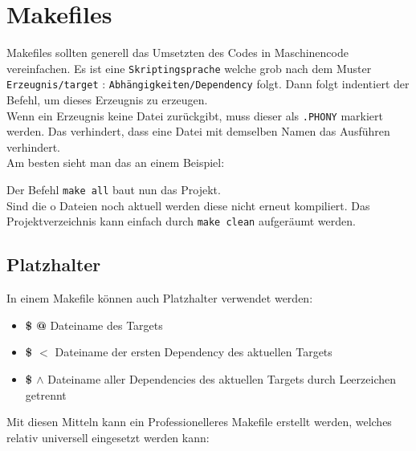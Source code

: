 \section{Makefiles}

Makefiles sollten generell das Umsetzten des Codes in Maschinencode vereinfachen.
Es ist eine \texttt{Skriptingsprache} welche grob nach dem Muster \texttt{Erzeugnis/target} : \texttt{Abhängigkeiten/Dependency} folgt. 
Dann folgt indentiert der Befehl, um dieses Erzeugnis zu erzeugen.\\
Wenn ein Erzeugnis keine Datei zurückgibt, muss dieser als \texttt{.PHONY} markiert werden. 
Das verhindert, dass eine Datei mit demselben Namen das Ausführen verhindert.\\
Am besten sieht man das an einem Beispiel:


Der Befehl \texttt{make all} baut nun das Projekt.\\
Sind die o Dateien noch aktuell werden diese nicht erneut kompiliert. 
Das Projektverzeichnis kann einfach durch \texttt{make clean} aufgeräumt werden.

\subsection{Platzhalter}

In einem Makefile können auch Platzhalter verwendet werden:

\begin{itemize}[itemsep=1pt, parsep=0pt]
    \item \textbf{\$ @} Dateiname des Targets
    \item \textbf{\$ $<$} Dateiname der ersten Dependency des aktuellen Targets
    \item \textbf{\$ $\wedge$} Dateiname aller Dependencies des aktuellen Targets durch Leerzeichen getrennt
\end{itemize}

Mit diesen Mitteln kann ein Professionelleres Makefile erstellt werden, welches relativ universell eingesetzt werden kann:

